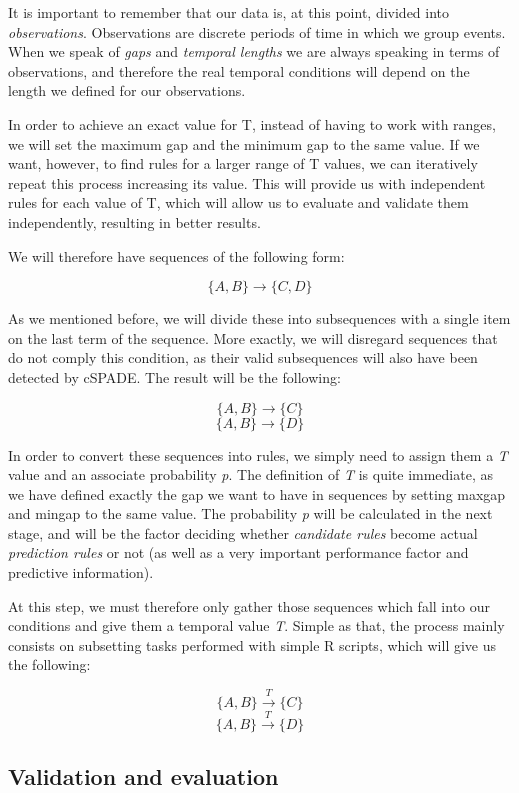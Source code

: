 \documentclass[a4paper,12pt]{article}
\begin{document}
It is important to remember that our data is, at this point, divided into \emph{observations}. Observations are discrete periods of time in which we group events. When we speak of \emph{gaps} and \emph{temporal lengths} we are always speaking in terms of observations, and therefore the real temporal conditions will depend on the length we defined for our observations.

In order to achieve an exact value for T, instead of having to work with ranges, we will set the maximum gap and the minimum gap to the same value. If we want, however, to find rules for a larger range of T values, we can iteratively repeat this process increasing its value. This will provide us with independent rules for each value of T, which will allow us to evaluate and validate them independently, resulting in better results. 

We will therefore have sequences of the following form:

$$\{A, B\} \longrightarrow \{C, D\}$$

As we mentioned before, we will divide these into subsequences with a single item on the last term of the sequence. More exactly, we will disregard sequences that do not comply this condition, as their valid subsequences will also have been detected by cSPADE. The result will be the following:

$$\{A, B\} \longrightarrow \{C\}$$
$$\{A, B\} \longrightarrow \{D\}$$

In order to convert these sequences into rules, we simply need to assign them a \emph{T} value and an associate probability \emph{p}. The definition of \emph{T} is quite immediate, as we have defined exactly the gap we want to have in sequences by setting maxgap and mingap to the same value. The probability \emph{p} will be calculated in the next stage, and will be the factor deciding whether \emph{candidate rules} become actual \emph{prediction rules} or not (as well as a very important performance factor and predictive information).

At this step, we must therefore only gather those sequences which fall into our conditions and give them a temporal value \emph{T}. Simple as that, the process mainly consists on subsetting tasks performed with simple R scripts, which will give us the following:

$$\{A, B\} \xrightarrow{T} \{C\}$$
$$\{A, B\} \xrightarrow{T} \{D\}$$


\subsection{Validation and evaluation} \label{sec:validation_evaluation}
\end{document}
